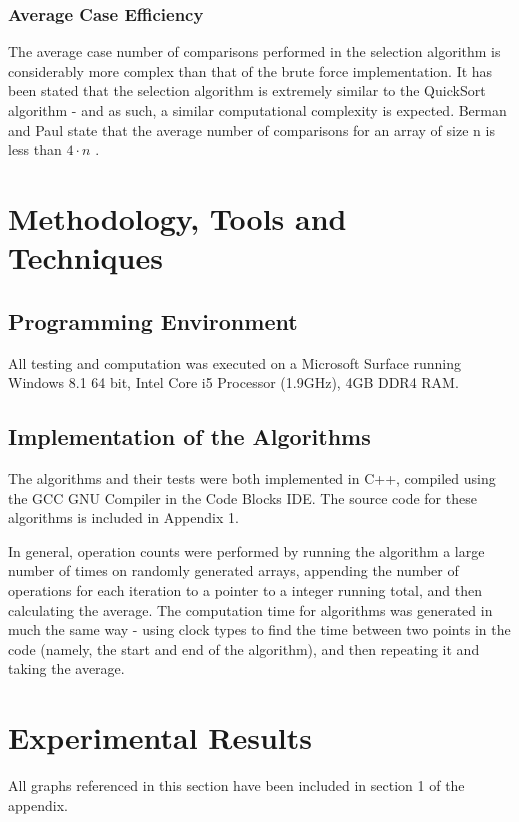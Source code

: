 \documentclass{article}
\begin{document}
        \subsubsection{Average Case Efficiency}
            The average case number of comparisons performed in the selection algorithm is considerably more complex than that of the brute force implementation. It has been stated that the selection algorithm is extremely similar to the QuickSort algorithm - and as such, a similar computational complexity is expected. Berman and Paul state that the average number of comparisons for an array of size n is less than $4\cdot n$ \cite{kenneth2004}.

\section{Methodology, Tools and Techniques}
    \subsection{Programming Environment}
        All testing and computation was executed on a Microsoft Surface running Windows 8.1 64 bit, Intel Core i5 Processor (1.9GHz), 4GB DDR4 RAM.
        \subsection{Implementation of the Algorithms}
        The algorithms and their tests were both implemented in C++, compiled using the GCC GNU Compiler in the Code Blocks IDE. The source code for these algorithms is included in Appendix 1.

        In general, operation counts were performed by running the algorithm a large number of times on randomly generated arrays, appending the number of operations for each iteration to a pointer to a integer running total, and then calculating the average. The computation time for algorithms was generated in much the same way - using clock types to find the time between two points in the code (namely, the start and end of the algorithm), and then repeating it and taking the average.
 
\section{Experimental Results}
    All graphs referenced in this section have been included in section 1 of the appendix.
\end{document}
